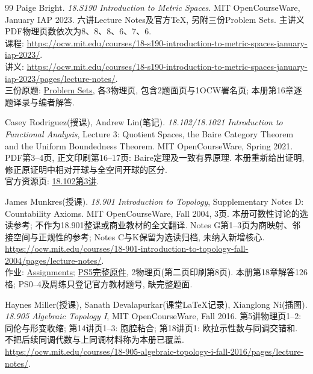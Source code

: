 \begin{thebibliography}{99}
Paige Bright. \textit{18.S190 Introduction to Metric Spaces}. MIT OpenCourseWare, January IAP 2023. 六讲Lecture Notes及官方TeX, 另附三份Problem Sets. 主讲义PDF物理页数依次为8、8、8、6、7、6.\\
课程: \url{https://ocw.mit.edu/courses/18-s190-introduction-to-metric-spaces-january-iap-2023/}.\\
讲义: \url{https://ocw.mit.edu/courses/18-s190-introduction-to-metric-spaces-january-iap-2023/pages/lecture-notes/}.\\
三份原题: \href{https://ocw.mit.edu/courses/18-s190-introduction-to-metric-spaces-january-iap-2023/pages/problem-sets/}{Problem Sets}, 各3物理页, 包含2题面页与1OCW署名页; 本册第16章逐题译录与编者解答.

Casey Rodriguez(授课), Andrew Lin(笔记). \textit{18.102/18.1021 Introduction to Functional Analysis}, Lecture 3: Quotient Spaces, the Baire Category Theorem and the Uniform Boundedness Theorem. MIT OpenCourseWare, Spring 2021. PDF第3--4页, 正文印刷第16--17页: Baire定理及一致有界原理. 本册重新给出证明, 修正原证明中相对开球与全空间开球的区分.\\
官方资源页: \href{https://ocw.mit.edu/courses/18-102-introduction-to-functional-analysis-spring-2021/resources/lecture-3-quotient-spaces-the-baire-category-theorem-and-the-uniform-boundedness-theorem/}{18.102第3讲}.

James Munkres(授课). \textit{18.901 Introduction to Topology}, Supplementary Notes D: Countability Axioms. MIT OpenCourseWare, Fall 2004, 3页. 本册可数性讨论的选读参考; 不作为18.901整课或商业教材的全文翻译. Notes G第1--3页为商映射、邻接空间与正规性的参考; Notes C与K保留为选读归档, 未纳入新增核心.\\
\url{https://ocw.mit.edu/courses/18-901-introduction-to-topology-fall-2004/pages/lecture-notes/}.\\
作业: \href{https://ocw.mit.edu/courses/18-901-introduction-to-topology-fall-2004/pages/assignments/}{Assignments}; \href{https://ocw.mit.edu/courses/18-901-introduction-to-topology-fall-2004/d6c5d6d30bf26300b6f1b2c278791796_problemset_5.pdf}{PS5完整原件}, 2物理页(第二页印刷第8页). 本册第18章解答126格; PS0--4及周练只登记官方教材题号, 缺完整题面.

Haynes Miller(授课), Sanath Devalapurkar(课堂LaTeX记录), Xianglong Ni(插图). \textit{18.905 Algebraic Topology I}, MIT OpenCourseWare, Fall 2016. 第5讲物理页1--2: 同伦与形变收缩; 第14讲页1--3: 胞腔粘合; 第18讲页1: 欧拉示性数与同调交错和. 不把后续同调代数与上同调材料称为本册已覆盖.\\
\url{https://ocw.mit.edu/courses/18-905-algebraic-topology-i-fall-2016/pages/lecture-notes/}.


\end{thebibliography}
